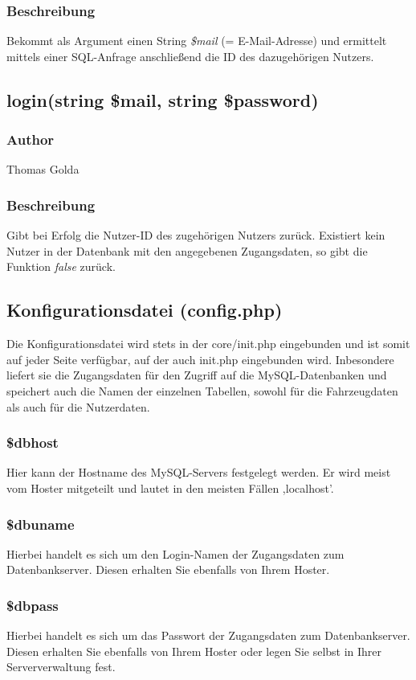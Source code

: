 \documentclass[fontsize = 12pt, paper = a4]{scrreprt}
\begin{document}
\subsubsection*{Beschreibung}
Bekommt als Argument einen String \textit{\$mail} (= E-Mail-Adresse) und ermittelt mittels einer SQL-Anfrage anschließend die ID des dazugehörigen Nutzers.


\subsection*{login(string \$mail, string \$password)}
\subsubsection*{Author}
Thomas Golda
\subsubsection*{Beschreibung}
Gibt bei Erfolg die Nutzer-ID des zugehörigen Nutzers zurück. Existiert kein Nutzer in der Datenbank mit den angegebenen Zugangsdaten, so gibt die Funktion \textit{false} zurück.

\newpage
\subsection{Konfigurationsdatei (config.php)}
Die Konfigurationsdatei wird stets in der core/init.php eingebunden und ist somit auf jeder Seite verfügbar, auf der auch init.php eingebunden wird. Inbesondere liefert sie die Zugangsdaten für den Zugriff auf die MySQL-Datenbanken und speichert auch die Namen der einzelnen Tabellen, sowohl für die Fahrzeugdaten als auch für die Nutzerdaten.
\subsubsection*{\$dbhost}
Hier kann der Hostname des MySQL-Servers festgelegt werden. Er wird meist vom Hoster mitgeteilt und lautet in den meisten Fällen ,localhost'.
\subsubsection*{\$dbuname}
Hierbei handelt es sich um den Login-Namen der Zugangsdaten zum Datenbankserver. Diesen erhalten Sie ebenfalls von Ihrem Hoster.
\subsubsection*{\$dbpass}
Hierbei handelt es sich um das Passwort der Zugangsdaten zum Datenbankserver. Diesen erhalten Sie ebenfalls von Ihrem Hoster oder legen Sie selbst in Ihrer Serververwaltung fest.
\end{document}
